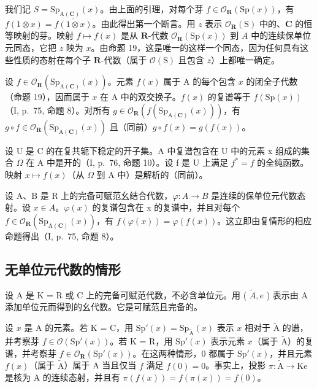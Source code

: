 我们记 \(S = \text{Sp}_{\text{A}(\mathbf{C})}(x)\)。由上面的引理，对每个芽 \(f \in \mathcal{O}_{\mathbf{R}}(\text{Sp}(x))\)，有 \(f(1 \otimes x) = \overline{f(1 \otimes x)}\)。由此得出第一个断言。用 \(z\) 表示 \(\mathcal{O}_{\mathbf{R}}(\text{S})\) 中的、\(\mathbf{C}\) 的恒等映射的芽。映射 \(f \mapsto f(x)\) 是从 \(\mathbf{R}\)-代数 \(\mathcal{O}_{\mathbf{R}}(\text{Sp}(x))\) 到 \(A\) 中的连续保单位元同态，它把 \(z\) 映为 \(x\)。由命题 19，这是唯一的这样一个同态，因为任何具有这些性质的态射在每个子 \(\mathbf{R}\)-代数（属于 \(\mathcal{O}(\text{S})\) 且包含 \(z\)）上都唯一确定。

设 \(f \in \mathcal{O}_{\mathbf{R}}(\mathrm{Sp}_{\mathrm{A}(\mathbf{C})}(x))\)。元素 \(f(x)\) 属于 A 的每个包含 \(x\) 的闭全子代数（命题 19），因而属于 \(x\) 在 A 中的双交换子。\(f(x)\) 的复谱等于 \(f(\mathrm{Sp}(x))\)（I, p.~75, 命题 8）。对所有 \(g \in \mathcal{O}_{\mathbf{R}}(f(\mathrm{Sp}_{\mathrm{A}(\mathbf{C})}(x)))\)，有 \(g \circ f \in \mathcal{O}_{\mathbf{R}}(\mathrm{Sp}_{\mathrm{A}(\mathbf{C})}(x))\) 且（同前）\(g \circ f(x) = g(f(x))\)。

设 U 是 C 的在复共轭下稳定的开子集。A 中复谱包含在 U 中的元素 x 组成的集合 \(\Omega\) 在 A 中是开的（I, p.~76, 命题 10）。设 f 是 U 上满足 \(f^{*} = f\) 的全纯函数。映射 \(x \mapsto f(x)\)（从 \(\Omega\) 到 A 中）是解析的（同前）。

设 A、B 是 R 上的完备可赋范幺结合代数，\(\varphi\colon A\to B\) 是连续的保单位元代数态射。设 \(x\in A\)。\(\varphi(x)\) 的复谱包含在 x 的复谱中，并且对每个 \(f\in\mathcal{O}_{\mathbf{R}}(\mathrm{Sp}_{\mathrm{A}(\mathbf{C})}(x))\)，有 \(f(\varphi(x))=\varphi(f(x))\)。这立即由复情形的相应命题得出（I, p.~75, 命题 8）。

\subsection{无单位元代数的情形}

设 A 是 K = R 或 C 上的完备可赋范代数，不必含单位元。用 ( \(\widetilde{A}, e\) ) 表示由 A 添加单位元而得到的幺代数。它是可赋范且完备的。

设 \(x\) 是 A 的元素。若 K = C，用 \(\mathrm{Sp}'(x) = \mathrm{Sp}_{\widetilde{\mathrm{A}}} (x)\) 表示 \(x\) 相对于 \(\widetilde{\mathrm{A}}\) 的谱，并考察芽 \(f \in \mathcal{O}(\mathrm{Sp}'(x))\)。若 K = R，用 \(\mathrm{Sp}'(x)\) 表示元素 \(x\)（属于 \(\widetilde{\mathrm{A}}\)）的复谱，并考察芽 \(f \in \mathcal{O}_{\mathbf{R}}(\mathrm{Sp}'(x))\)。在这两种情形，0 都属于 \(\mathrm{Sp}'(x)\)，并且元素 \(f(x)\)（属于 \(\widetilde{\mathrm{A}}\)）属于 A 当且仅当 \(f\) 满足 \(f(0) = 0\)。事实上，投影 \(\pi: \widetilde{\mathrm{A}} \to \mathrm{Ke}\) 是核为 A 的连续态射，并且有 \(\pi(f(x)) = f(\pi(x)) = f(0)\)。

